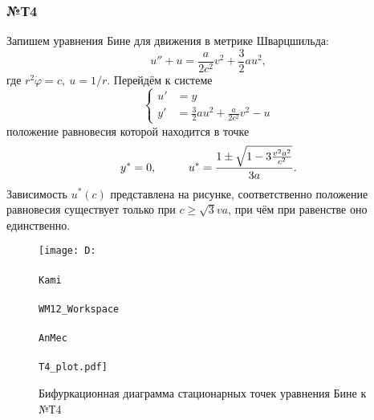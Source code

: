 \subsubsection*{№Т4}

Запишем уравнения Бине для движения в метрике Шварцшильда:
\begin{equation*}
    u'' + u = \frac{a}{2c^2} v^2 + \frac{3}{2}a u^2,
\end{equation*}
где $r^2 \dot{\varphi} = c, \ u=1/r$. Перейдём к системе
\begin{equation*}
    \left\{\begin{aligned}
        u' &= y \\
        y' &= \frac{3}{2} a u^2 + \frac{a}{2c^2} v^2 - u
    \end{aligned}\right.
\end{equation*}
положение равновесия которой находится в точке
\begin{equation*}
    y^* = 0, \hspace{1 cm}
    u^* = 
    \frac{1\pm \sqrt{1-3 \frac{v^2 a^2}{c^2}}}{3a}.
\end{equation*}
Зависимость $u^*(c)$ представлена на рисунке, соответственно положение равновесия существует только при $c \geq \sqrt{3} v a$, при чём при равенстве оно единственно.
\begin{figure}[ht]
    \centering
    \texttt{[image: D:\\\\Kami\\\\WM12\_Workspace\\\\AnMec\\\\T4\_plot.pdf]}
    \caption{Бифуркационная диаграмма стационарных точек уравнения Бине к №Т4}
\end{figure}

